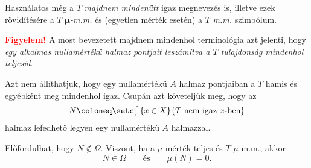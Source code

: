 \documentclass[
]{elteikthesis}[2024/04/26]
\begin{document}
	\begin{notes}
		\item
		Használatos még a \( T \) \emph{majdnem mindenütt} igaz megnevezés is,
		illetve ezek rövidítésére a \( T \) \emph{\( \boldsymbol{\mu} \)-m.m.} 
		és (egyetlen mérték esetén) a \( T \) \emph{m.m.} szimbólum.
		
		\item 
		\textbf{\textcolor{red}{Figyelem!}}
		A most bevezetett majdnem mindenhol terminológia azt jelenti, hogy 
		\textit{egy alkalmas nullamértékű halmaz pontjait leszámítva a \( T \) tulajdonság mindenhol teljesül}.
		
		Azt nem állíthatjuk, hogy egy nullamértékű \( A \) halmaz pontjaiban a \( T \) hamis
		és egyébként meg mindenhol igaz.
		Csupán azt követeljük meg, hogy az
		\[
			N \coloneq \setc[\big]{ x \in X }{ T \text{ nem igaz } x \text{-ben} }
		\]
		halmaz lefedhető legyen egy nullamértékű \( A \) halmazzal.
		
		\item 
		Előfordulhat, hogy \( N \notin \Omega \).
		Viszont, ha a \( \mu \) mérték teljes és \( T \) \( \mu \)-m.m., akkor
		\[
			N \in \Omega
			\qquad \text{és} \qquad
			\mu(N) = 0.
		\]
		
	\end{notes}
\end{document}
